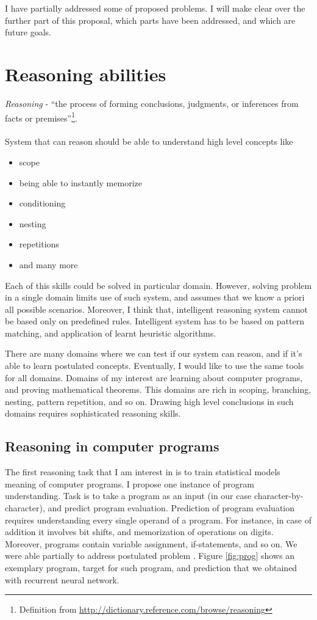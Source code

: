 \documentclass{article}
\begin{document}
I have partially addressed some of proposed problems. I will make clear over the further part of this proposal, 
which parts have been addressed, and which are future goals.



\section{Reasoning abilities}

\textit{Reasoning} - ``the process of forming conclusions, judgments, or inferences from facts or 
premises''\footnote{Definition from \url{http://dictionary.reference.com/browse/reasoning}}.
\\
\\
System that can reason should be able to understand high level concepts like 
\begin{itemize}
 \item scope
 \item being able to instantly memorize 
 \item conditioning
 \item nesting
 \item repetitions
 \item and many more
\end{itemize}
Each of this skills could be solved in particular domain. However, solving problem in a single domain
limits use of such system,
and assumes that we know a priori all possible scenarios. 
Moreover, I think that, intelligent reasoning system cannot be based only on predefined rules. 
Intelligent system has to be based on pattern matching, and application of learnt heuristic algorithms. 


There are many domains where we can test if our system can reason, and if it's able to learn postulated concepts. Eventually,
I would like to use the same tools for all domains. 
Domains of my interest are learning about computer programs, and 
proving mathematical theorems.
This domains are rich in scoping, branching, nesting, pattern repetition, and so on. Drawing
high level conclusions in such domains requires sophisticated reasoning skills.

\subsection{Reasoning in computer programs}
The first reasoning task that I am interest in is to train statistical models meaning of computer programs.
I propose one instance of program understanding.
Task is to take a program as an input (in our case character-by-character), and predict program evaluation. 
Prediction of program evaluation requires understanding every single operand of a program. For instance, in case of
addition it 
involves bit shifts, and memorization of operations on digits. Moreover, programs contain variable assignment, if-statements, and so on.
We were able partially to address postulated problem
\cite{zaremba2014execute}.
Figure \ref{fig:prog} shows
an exemplary program, target for such program, and prediction that we obtained with recurrent neural network.
\end{document}
